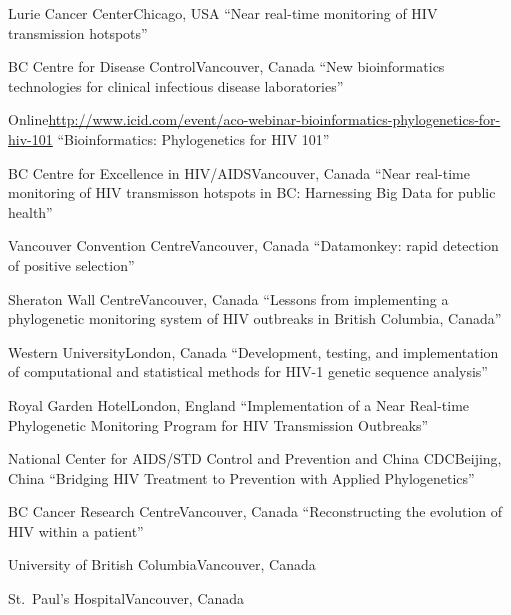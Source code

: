 {}

{Lurie Cancer Center}{Chicago, USA}
{``Near real-time monitoring of HIV transmission hotspots''}

{BC Centre for Disease Control}{Vancouver, Canada}
{``New bioinformatics technologies for clinical infectious disease laboratories''}

{Online}{\url{http://www.icid.com/event/aco-webinar-bioinformatics-phylogenetics-for-hiv-101}}
{``Bioinformatics: Phylogenetics for HIV 101''}

{BC Centre for Excellence in HIV/AIDS}{Vancouver, Canada}
{``Near real-time monitoring of HIV transmisson hotspots in BC: Harnessing Big Data for public health''}

{Vancouver Convention Centre}{Vancouver, Canada}
{``Datamonkey: rapid detection of positive selection''}

{Sheraton Wall Centre}{Vancouver, Canada}
{``Lessons from implementing a phylogenetic monitoring system of HIV outbreaks in British Columbia, Canada''}

{Western University}{London, Canada}
{``Development, testing, and implementation of computational and statistical methods for HIV-1 genetic sequence analysis''}

{Royal Garden Hotel}{London, England}
{``Implementation of a Near Real-time Phylogenetic Monitoring Program for HIV Transmission Outbreaks''}

{National Center for AIDS/STD Control and Prevention and China CDC}{Beijing, China}
{``Bridging HIV Treatment to Prevention with Applied Phylogenetics''}

{BC Cancer Research Centre}{Vancouver, Canada}
{``Reconstructing the evolution of HIV within a patient''}

{University of British Columbia}{Vancouver, Canada}
{}

{St.~Paul's Hospital}{Vancouver, Canada}
{}


